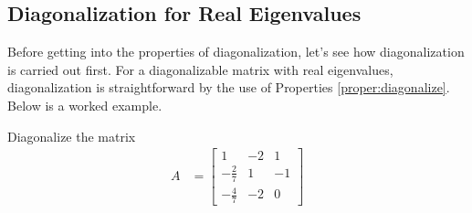 \subsection{Diagonalization for Real Eigenvalues}
\label{section:realeigen}

Before getting into the properties of diagonalization, let's see how diagonalization is carried out first. For a diagonalizable matrix with real eigenvalues, diagonalization is straightforward by the use of Properties \ref{proper:diagonalize}. Below is a worked example.
\begin{exmp}
Diagonalize the matrix 
\begin{align*}
A &= 
\begin{bmatrix}
1 & -2 & 1 \\ 
-\frac{2}{7} & 1 & -1 \\ 
-\frac{4}{7} & -2 & 0
\end{bmatrix}
\end{align*}
\end{exmp}
